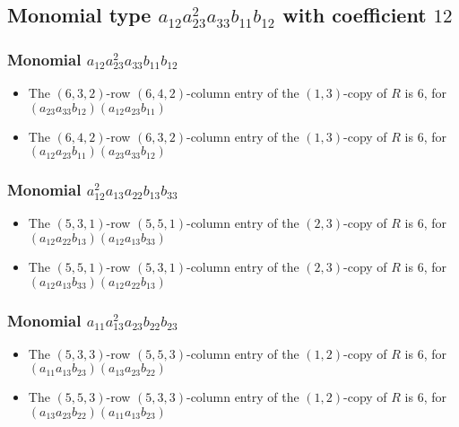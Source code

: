 \documentclass{article}
\begin{document}
\subsection{Monomial type $ a_{12} a_{23}^{2} a_{33} b_{11} b_{12} $ with coefficient $ 12 $}

\subsubsection{Monomial $ a_{12} a_{23}^{2} a_{33} b_{11} b_{12} $}

\begin{itemize}
\item The $(6, 3, 2)$-row $(6, 4, 2)$-column entry of the $ \left(1, 3\right) $-copy of $R$ is $ 6 $, for $( a_{23} a_{33} b_{12} )( a_{12} a_{23} b_{11} )$ 
\item The $(6, 4, 2)$-row $(6, 3, 2)$-column entry of the $ \left(1, 3\right) $-copy of $R$ is $ 6 $, for $( a_{12} a_{23} b_{11} )( a_{23} a_{33} b_{12} )$ 
\end{itemize}
\subsubsection{Monomial $ a_{12}^{2} a_{13} a_{22} b_{13} b_{33} $}

\begin{itemize}
\item The $(5, 3, 1)$-row $(5, 5, 1)$-column entry of the $ \left(2, 3\right) $-copy of $R$ is $ 6 $, for $( a_{12} a_{22} b_{13} )( a_{12} a_{13} b_{33} )$ 
\item The $(5, 5, 1)$-row $(5, 3, 1)$-column entry of the $ \left(2, 3\right) $-copy of $R$ is $ 6 $, for $( a_{12} a_{13} b_{33} )( a_{12} a_{22} b_{13} )$ 
\end{itemize}
\subsubsection{Monomial $ a_{11} a_{13}^{2} a_{23} b_{22} b_{23} $}

\begin{itemize}
\item The $(5, 3, 3)$-row $(5, 5, 3)$-column entry of the $ \left(1, 2\right) $-copy of $R$ is $ 6 $, for $( a_{11} a_{13} b_{23} )( a_{13} a_{23} b_{22} )$ 
\item The $(5, 5, 3)$-row $(5, 3, 3)$-column entry of the $ \left(1, 2\right) $-copy of $R$ is $ 6 $, for $( a_{13} a_{23} b_{22} )( a_{11} a_{13} b_{23} )$ 
\end{itemize}
\end{document}
